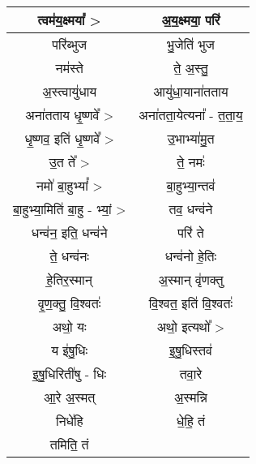 {\begin{longtable}{|c|c|}
\hline
त्वम॑य॒क्ष्मया᳚ >              & अ॒य॒क्ष्मया॒ परि॑\\
\hline
परि॑ब्भुज                   & भु॒जेति॑ भुज\\
\hline
नम॑स्ते                     & ते॒ अ॒स्तु॒\\
\hline
अ॒स्त्वायु॑धाय                & आयु॑धा॒याना॑तताय\\
\hline
अना॑तताय धृ॒ष्णवे᳚ >           & अना॑तता॒येत्यना᳚ - त॒ता॒य॒\\
\hline
धृ॒ष्णव॒ इति॑ धृ॒ष्णवे᳚ >          & उ॒भाभ्या॑मु॒त\\
\hline
उ॒त ते᳚ >                   & ते॒ नमः॑\\
\hline
नमो॑ बा॒हुभ्यां᳚ >             & बा॒हुभ्या॒न्तव॑\\
\hline
बा॒हुभ्या॒मिति॑ बा॒हु - भ्यां॒ >   & तव॒ धन्व॑ने\\
\hline
धन्व॑न॒ इति॒ धन्व॑ने            & परि॑ ते\\
\hline
ते॒ धन्व॑नः                  & धन्व॑नो हे॒तिः\\
\hline
हे॒तिर॒स्मान्                 & अ॒स्मान् वृ॑णक्तु\\
\hline
वृ॒ण॒क्तु॒ वि॒श्वतः॑              & वि॒श्वत॒ इति॑ वि॒श्वतः॑\\
\hline
अथो॒ यः                   & अथो॒ इत्यथो᳚ >\\
\hline
य इ॑षु॒धिः                  & इ॒षु॒धिस्तव॑\\
\hline
इ॒षु॒धिरिती॑षु - धिः          & तवा॒रे\\
\hline
आ॒रे अ॒स्मत्                  & अ॒स्मन्नि\\
\hline
निधे॑हि                    & धे॒हि॒ तं\\
\hline
तमिति॒ तं                  & \\
\hline
\end{longtable}
}
